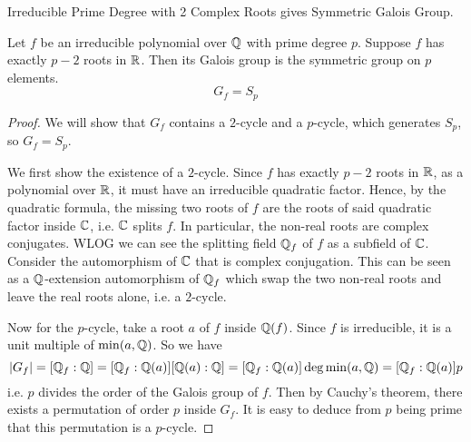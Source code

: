 \documentclass[../book.tex]{subfiles}
\begin{document}
\begin{thm} Irreducible Prime Degree with 2 Complex Roots 
gives Symmetric Galois Group. 
    
    Let $f$ be an irreducible polynomial over $\mathbb{Q}$ with prime degree $p$.
    Suppose $f$ has exactly $p-2$ roots in $\mathbb{R}$. 
    Then its Galois group is the symmetric group on $p$ elements. 
    \[ G_f = S_p \]
    
\end{thm}
\begin{proof}
    
    We will show that $G_f$ contains a $2$-cycle and a $p$-cycle,
    which generates $S_p$, so $G_f = S_p$.
    
    We first show the existence of a $2$-cycle. 
    Since $f$ has exactly $p-2$ roots in $\mathbb{R}$, 
    as a polynomial over $\mathbb{R}$, it must have an irreducible quadratic factor. 
    Hence, by the quadratic formula, 
    the missing two roots of $f$ are the roots of said quadratic factor inside $\mathbb{C}$,
    i.e. $\mathbb{C}$ splits $f$. 
    In particular, the non-real roots are complex conjugates. 
    WLOG we can see the splitting field $\mathbb{Q}_f$ of $f$ as a subfield of $\mathbb{C}$.
    Consider the automorphism of $\mathbb{C}$ that is complex conjugation. 
    This can be seen as a $\mathbb{Q}$-extension automorphism of $\mathbb{Q}_f$
    which swap the two non-real roots and leave the real roots alone, 
    i.e. a $2$-cycle. 
    
    Now for the $p$-cycle, take a root $a$ of $f$ inside $\mathbb{Q}(f)$.
    Since $f$ is irreducible, it is a unit multiple of $\min(a,\mathbb{Q})$. 
    So we have \[
        |G_f| = [\mathbb{Q}_f : \mathbb{Q}] = [\mathbb{Q}_f : \mathbb{Q}(a)] [\mathbb{Q}(a) : \mathbb{Q}]
        = [\mathbb{Q}_f : \mathbb{Q}(a)] \deg \min(a,\mathbb{Q}) = [\mathbb{Q}_f : \mathbb{Q}(a)] p 
    \]
    i.e. $p$ divides the order of the Galois group of $f$. 
    Then by Cauchy's theorem, there exists a permutation of order $p$ inside $G_f$. 
    It is easy to deduce from $p$ being prime that this permutation is a $p$-cycle. 
    
\end{proof}
\end{document}
